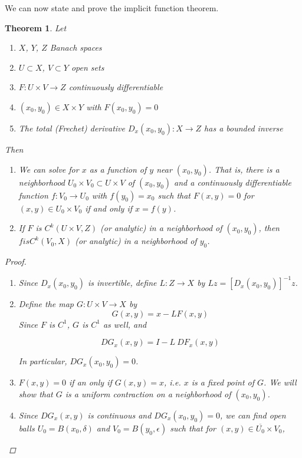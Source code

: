 \documentclass{article}
\newtheorem{theorem}{Theorem}[section]
\begin{document}
We can now state and prove the implicit function theorem.

\begin{theorem} 
Let
\begin{enumerate}
\item $X$, $Y$, $Z$ Banach spaces
\item $U \subset X$, $V \subset Y$ open sets
\item $F: U \times V \rightarrow Z$ continuously differentiable
\item $(x_0, y_0) \in X \times Y$ with $F(x_0, y_0) = 0$
\item The total (Frechet) derivative $D_x(x_0, y_0): X \rightarrow Z$ has a bounded inverse
\end{enumerate}
Then
\begin{enumerate}
\item We can solve for $x$ as a function of $y$ near $(x_0, y_0)$. That is, there is a neighborhood $U_0 \times V_0 \subset U \times V$ of $(x_0, y_0)$ and a continuously differentiable function $f: V_0 \rightarrow U_0$ with $f(y_0) = x_0$ such that $F(x, y) = 0$ for $(x, y) \in U_0 \times V_0$ if and only if $x = f(y)$.

\item If $F$ is $C^k(U \times V, Z)$ (or analytic) in a neighborhood of $(x_0, y_0)$, then $f is C^k(V_0,X)$ (or analytic) in a neighborhood of $y_0$.
\end{enumerate}

\begin{proof}
\begin{enumerate}
\item Since $D_x(x_0, y_0)$ is invertible, define $L: Z \rightarrow X$ by $Lz = [D_x(x_0, y_0)]^{-1}z$. 
\item Define the map $G: U \times V \rightarrow X$ by 
\begin{equation}\label{defG}
G(x, y) = x - L F(x, y)
\end{equation}
Since $F$ is $C^1$, $G$ is $C^1$ as well, and

\[
DG_x(x, y) = I - L \: DF_x(x, y)
\]

In particular, $DG_x(x_0, y_0) = 0$.

\item $F(x, y) = 0$ if an only if $G(x, y) = x$, i.e. $x$ is a fixed point of $G$. We will show that $G$ is a uniform contraction on a neighborhood of $(x_0, y_0)$. 

\item Since $DG_x(x, y)$ is continuous and $DG_x(x_0, y_0) = 0$, we can find open balls $U_0 = B(x_0, \delta)$ and $V_0 = B(y_0, \epsilon)$ such that for $(x, y) \in \overline{U_0} \times V_0$,


\end{enumerate}
\end{proof}
\end{theorem}
\end{document}
